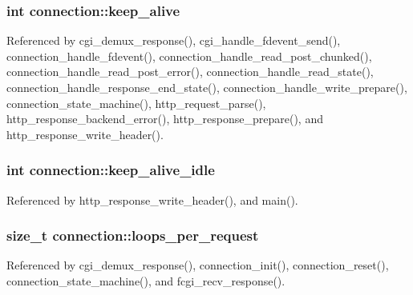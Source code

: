 \hypertarget{structconnection_a3c26e699587345c2ab4039b4fbc5dd44}{
\subsubsection[{keep\-\_\-alive}]{\setlength{\rightskip}{0pt plus 5cm}int connection\-::keep\-\_\-alive}}\label{structconnection_a3c26e699587345c2ab4039b4fbc5dd44}


Referenced by cgi\-\_\-demux\-\_\-response(), cgi\-\_\-handle\-\_\-fdevent\-\_\-send(), connection\-\_\-handle\-\_\-fdevent(), connection\-\_\-handle\-\_\-read\-\_\-post\-\_\-chunked(), connection\-\_\-handle\-\_\-read\-\_\-post\-\_\-error(), connection\-\_\-handle\-\_\-read\-\_\-state(), connection\-\_\-handle\-\_\-response\-\_\-end\-\_\-state(), connection\-\_\-handle\-\_\-write\-\_\-prepare(), connection\-\_\-state\-\_\-machine(), http\-\_\-request\-\_\-parse(), http\-\_\-response\-\_\-backend\-\_\-error(), http\-\_\-response\-\_\-prepare(), and http\-\_\-response\-\_\-write\-\_\-header().

\hypertarget{structconnection_a60fbb1938d3a5f459b005b150f6dc9db}{
\subsubsection[{keep\-\_\-alive\-\_\-idle}]{\setlength{\rightskip}{0pt plus 5cm}int connection\-::keep\-\_\-alive\-\_\-idle}}\label{structconnection_a60fbb1938d3a5f459b005b150f6dc9db}


Referenced by http\-\_\-response\-\_\-write\-\_\-header(), and main().

\hypertarget{structconnection_af0f62059eb64e548372987ea930b80da}{
\subsubsection[{loops\-\_\-per\-\_\-request}]{\setlength{\rightskip}{0pt plus 5cm}size\-\_\-t connection\-::loops\-\_\-per\-\_\-request}}\label{structconnection_af0f62059eb64e548372987ea930b80da}


Referenced by cgi\-\_\-demux\-\_\-response(), connection\-\_\-init(), connection\-\_\-reset(), connection\-\_\-state\-\_\-machine(), and fcgi\-\_\-recv\-\_\-response().

